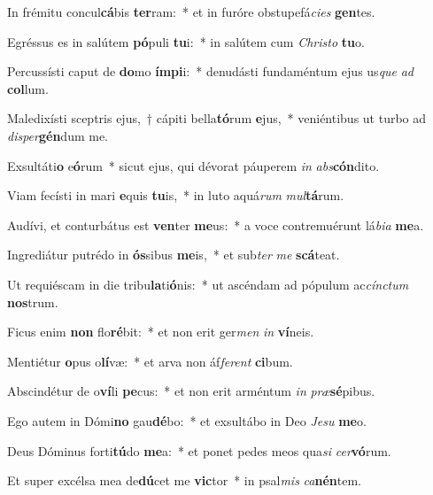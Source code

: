 \item In frémitu concul\textbf{cá}bis \textbf{ter}ram:~* et in furóre obstupefá\textit{ci}\textit{es} \textbf{gen}tes.
\item Egréssus es in salútem \textbf{pó}puli \textbf{tu}i:~* in salútem cum \textit{Chris}\textit{to} \textbf{tu}o.
\item Percussísti caput de \textbf{do}mo \textbf{ím}\textbf{pi}i:~* denudásti fundaméntum ejus us\textit{que} \textit{ad} \textbf{col}lum.
\item Maledixísti sceptris ejus,~† cápiti bella\textbf{tó}rum \textbf{e}jus,~* veniéntibus ut turbo ad \textit{di}\textit{sper}\textbf{gén}dum me.
\item Exsultáti\textbf{o} e\textbf{ó}rum~* sicut ejus, qui dévorat páuperem \textit{in} \textit{abs}\textbf{cón}dito.
\item Viam fecísti in mari \textbf{e}quis \textbf{tu}is,~* in luto aquá\textit{rum} \textit{mul}\textbf{tá}rum.
\item Audívi, et conturbátus est \textbf{ven}ter \textbf{me}us:~* a voce contremuérunt lá\textit{bi}\textit{a} \textbf{me}a.
\item Ingrediátur putrédo in \textbf{ós}sibus \textbf{me}is,~* et sub\textit{ter} \textit{me} \textbf{scá}teat.
\item Ut requiéscam in die tribu\textbf{la}ti\textbf{ó}nis:~* ut ascéndam ad pópulum ac\textit{cínc}\textit{tum} \textbf{nos}trum.
\item Ficus enim \textbf{non} flo\textbf{ré}bit:~* et non erit ger\textit{men} \textit{in} \textbf{ví}neis.
\item Mentiétur \textbf{o}pus o\textbf{lí}væ:~* et arva non áf\textit{fe}\textit{rent} \textbf{ci}bum.
\item Abscindétur de o\textbf{ví}li \textbf{pe}cus:~* et non erit arméntum \textit{in} \textit{præ}\textbf{sé}pibus.
\item Ego autem in Dómi\textbf{no} gau\textbf{dé}bo:~* et exsultábo in Deo \textit{Je}\textit{su} \textbf{me}o.
\item Deus Dóminus forti\textbf{tú}do \textbf{me}a:~* et ponet pedes meos qua\textit{si} \textit{cer}\textbf{vó}rum.
\item Et super excélsa mea de\textbf{dú}cet me \textbf{vic}tor~* in psal\textit{mis} \textit{ca}\textbf{nén}tem.
